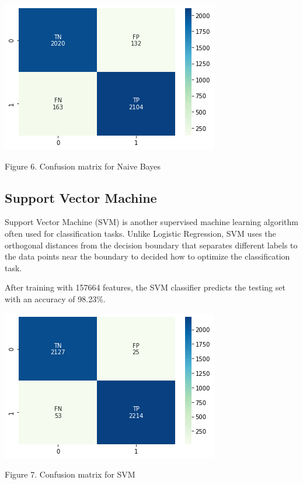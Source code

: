 \documentclass{article}
\begin{document}
\begin{multicols}{2}
\begin{center}
\includegraphics[scale=0.45]{images/nbcm.png}
\newline
\caption{Figure 6. Confusion matrix for Naive Bayes}
\end{center}

\subsection{Support Vector Machine}
Support Vector Machine (SVM) is another supervised machine learning algorithm often used for classification tasks. Unlike Logistic Regression, SVM uses the orthogonal distances from the decision boundary that separates different labels to the data points near the boundary to decided how to optimize the classification task. 

After training with 157664 features, the SVM classifier predicts the testing set with an accuracy of 98.23\%.

\begin{center}
\includegraphics[scale=0.45]{images/svmcm.png}
\newline
\caption{Figure 7. Confusion matrix for SVM}
\end{center}


\end{multicols}
\end{document}
